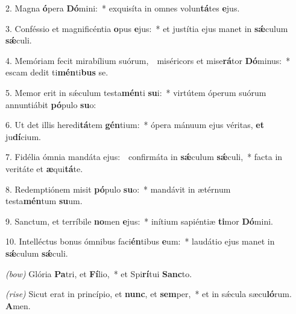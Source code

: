 2. Magna \textbf{ó}pera \textbf{Dó}mini:~* exquisíta in omnes volun\textbf{tá}tes \textbf{e}jus.

3. Conféssio et magnificéntia \textbf{o}pus \textbf{e}jus:~* et justítia ejus manet in \textbf{s\'{\ae}}culum \textbf{s\'{\ae}}culi.

4. Memóriam fecit mirabílium suórum,~{\color{red}\GreDagger}\ miséricors et mise\textbf{rá}tor \textbf{Dó}minus:~* escam dedit ti\textbf{mén}ti\textbf{bus} se.

5. Memor erit in s\'{\ae}culum testa\textbf{mén}ti \textbf{su}i:~* virtútem óperum suórum annuntiábit \textbf{pó}pulo \textbf{su}o:

6. Ut det illis heredi\textbf{tá}tem \textbf{gén}tium:~* ópera mánuum ejus véritas, \textbf{et}\\ ju\textbf{dí}cium.

7. Fidélia ómnia mandáta ejus:~{\color{red}\GreDagger}\ confirmáta in \textbf{s\'{\ae}}culum \textbf{s\'{\ae}}culi,~* facta in veritáte et \textbf{æ}qui\textbf{tá}te.

8. Redemptiónem misit \textbf{pó}pulo \textbf{su}o:~* mandávit in ætérnum\\ testa\textbf{mén}tum \textbf{su}um.

9. Sanctum, et terríbile \textbf{no}men \textbf{e}jus:~* inítium sapiéntiæ \textbf{ti}mor \textbf{Dó}mini.

10. Intelléctus bonus ómnibus faci\textbf{én}tibus \textbf{e}um:~* laudátio ejus manet in \textbf{s\'{\ae}}culum \textbf{s\'{\ae}}culi.

\textit{(bow)} Glória \textbf{Pa}tri, et \textbf{Fí}lio,~* et Spi\textbf{rí}tui \textbf{Sanc}to.

\textit{(rise)} Sicut erat in princípio, et \textbf{nunc}, et \textbf{sem}per,~* et in s\'{\ae}cula sæcu\textbf{ló}rum. \textbf{A}men.